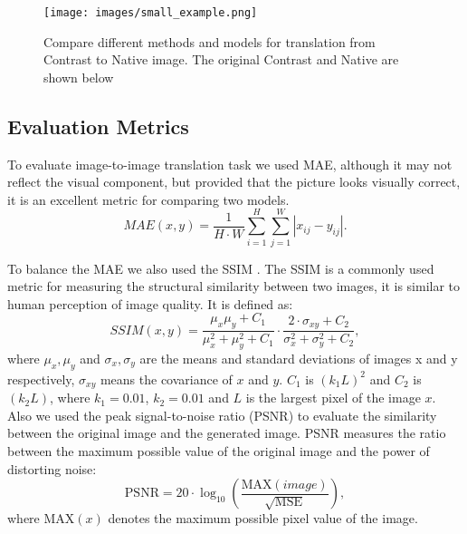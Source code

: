 \documentclass{article}
\begin{document}
\begin{figure}[h!]
    \centering
    \texttt{[image: images/small\_example.png]}
    \caption{Compare different methods and models for translation from Contrast to Native image. The original Contrast and Native are shown below}
    \label{app:image_visual}
\end{figure}

\subsection{Evaluation Metrics}

To evaluate image-to-image translation task we used MAE, although it may not reflect the visual component, but provided that the picture looks visually correct, it is an excellent metric for comparing two models.
\begin{equation}
MAE(x, y) = \frac{1}{H\cdot W}\sum\limits_{i=1}^H\sum\limits_{j=1}^W |x_{ij}-y_{ij}|.
\end{equation}

To balance the MAE we also used the SSIM \citep{1284395}. The SSIM is a commonly used metric for measuring the structural similarity between two images, it is similar to human perception of image quality. It is defined as:
\begin{equation}
SSIM(x, y) = \frac{\mu_x\mu_y+C_1}{\mu_x^2 + \mu_y^2+C_1} \cdot \frac{2\cdot\sigma_{xy}+C_2}{\sigma_x^2 + \sigma_y^2 + C_2},
\label{eq:ssim_loss}
\end{equation}
where $\mu_x, \mu_y$ and $\sigma_x, \sigma_y$ are the means and standard deviations of images x and y respectively, $\sigma_{xy}$ means the covariance of $x$ and $y$. $C_1$ is $(k_1L)^2$ and $C_2$ is $(k_2L)$, where $k_1 = 0.01$, $k_2 = 0.01$ and $L$ is the largest pixel of the image $x$.
Also we used the peak signal-to-noise ratio (PSNR) \citep{korhonen2012peak} to evaluate the similarity between the original image and the generated image. PSNR measures the ratio between the maximum possible value of the original image and the power of distorting noise:
\begin{equation}
\text{PSNR} = 20 \cdot \log_{10}\left( \frac{\text{MAX}(image)}{\sqrt{\text{MSE}}}\right),
\end{equation}
where $\text{MAX}(x)$ denotes the maximum possible pixel value of the image.


\end{document}
